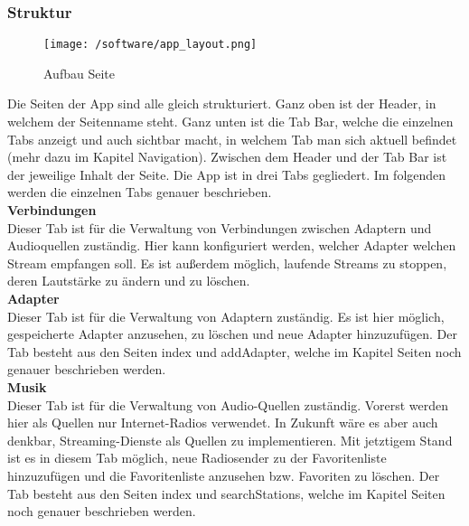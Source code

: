 \documentclass[]{article}
\begin{document}
\subsubsection{Struktur}
\begin{figure}[H]
\texttt{[image: /software/app\_layout.png]}
\caption{Aufbau Seite}
\end{figure}
Die Seiten der App sind alle gleich strukturiert. Ganz oben ist der Header, in welchem der Seitenname steht. Ganz unten ist die Tab Bar, welche die einzelnen Tabs anzeigt und auch sichtbar macht, in welchem Tab man sich aktuell befindet (mehr dazu im Kapitel Navigation). Zwischen dem Header und der Tab Bar ist der jeweilige Inhalt der Seite.
Die App ist in drei Tabs gegliedert. Im folgenden werden die einzelnen Tabs genauer beschrieben. \newline \\
\textbf{Verbindungen} \\
Dieser Tab ist für die Verwaltung von Verbindungen zwischen Adaptern und Audioquellen zuständig. Hier kann konfiguriert werden, welcher Adapter welchen Stream empfangen soll. Es ist außerdem möglich, laufende Streams zu stoppen, deren Lautstärke zu ändern und zu löschen. \newline \\
\textbf{Adapter} \\
Dieser Tab ist für die Verwaltung von Adaptern zuständig. Es ist hier möglich, gespeicherte Adapter anzusehen, zu löschen und neue Adapter hinzuzufügen. Der Tab besteht aus den Seiten index und addAdapter, welche im Kapitel Seiten noch genauer beschrieben werden.  \newline \\
\textbf{Musik} \\
Dieser Tab ist für die Verwaltung von Audio-Quellen zuständig. Vorerst werden hier als Quellen nur Internet-Radios verwendet. In Zukunft wäre es aber auch denkbar, Streaming-Dienste als Quellen zu implementieren. Mit jetztigem Stand ist es in diesem Tab möglich, neue Radiosender zu der Favoritenliste hinzuzufügen und die Favoritenliste anzusehen bzw. Favoriten zu löschen. Der Tab besteht aus den Seiten index und searchStations, welche im Kapitel Seiten noch genauer beschrieben werden.
\end{document}
